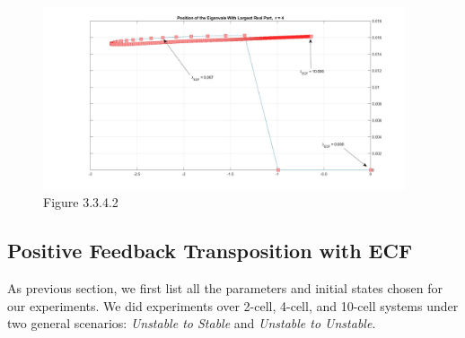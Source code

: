 \documentclass[12pt]{article}
\renewcommand{\(}{\left (}
\renewcommand{\)}{\right )}
\begin{document}
\begin{figure}[h!]
    \centering
	\begin{minipage}{0.99\textwidth}
		\centering
		\includegraphics[width=0.95\textwidth]{all_lambda_Ei2.jpg}
		\caption*{\small Figure 3.3.4.2}
	\end{minipage}
\end{figure}

\newpage

\subsection{Positive Feedback Transposition with ECF}

\hspace{5mm} As previous section, we first list all the parameters and initial states chosen for our experiments. We did experiments over 2-cell, 4-cell, and 10-cell systems under two general scenarios: \textit{Unstable to Stable} and \textit{Unstable to Unstable}. \\
\end{document}
